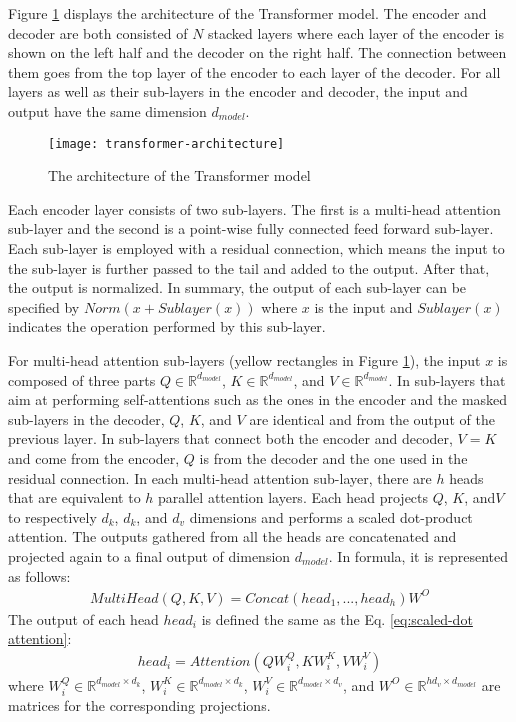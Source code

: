 Figure \ref{figure:transformer model} displays the architecture of the Transformer model. The encoder and decoder are both consisted of $ N $ stacked layers where each layer of the encoder is shown on the left half and the decoder on the right half. The connection between them goes from the top layer of the encoder to each layer of the decoder. For all layers as well as their sub-layers in the encoder and decoder, the input and output have the same dimension $ d_{model} $.

\begin{figure}[h]
\texttt{[image: transformer-architecture]}
\centering
\caption{The architecture of the Transformer model \cite{Vaswani2017}}
\label{figure:transformer model}
\end{figure}

Each encoder layer consists of two sub-layers. The first is a multi-head attention sub-layer and the second is a point-wise fully connected feed forward sub-layer. Each sub-layer is employed with a residual connection, which means the input to the sub-layer is further passed to the tail and added to the output. After that, the output is normalized. In summary, the output of each sub-layer can be specified by $ Norm(x+Sublayer(x)) $ where $ x $ is the input and $ Sublayer(x) $ indicates the operation performed by this sub-layer. 

For multi-head attention sub-layers (yellow rectangles in Figure \ref{figure:transformer model}), the input $ x $ is composed of three parts $ Q \in \mathbb{R}^{d_{model}} $, $ K \in \mathbb{R}^{d_{model}}$, and $ V \in \mathbb{R}^{d_{model}} $. In sub-layers that aim at performing self-attentions such as the ones in the encoder and the masked sub-layers in the decoder, $ Q $, $K$, and $V $ are identical and from the output of the previous layer. In sub-layers that connect both the encoder and decoder, $ V=K $ and come from the encoder, $ Q $ is from the decoder and the one used in the residual connection. In each multi-head attention sub-layer, there are $ h $ heads that are equivalent to $ h $ parallel attention layers. Each head projects $ Q $, $ K $, and$ V $ to respectively $ d_{k} $, $ d_{k} $, and $ d_{v} $ dimensions and performs a scaled dot-product attention. The outputs gathered from all the heads are concatenated and projected again to a final output of dimension $ d_{model} $. In formula, it is represented as follows:
\begin{align*}
MultiHead(Q,K,V) = Concat(head_{1},...,head_{h})W^{O}
\end{align*}
The output of each head $ head_{i} $ is defined the same as the Eq. \ref{eq:scaled-dot attention}:
\begin{align*}
head_{i} = Attention(QW_{i}^{Q},KW_{i}^{K},VW_{i}^{V})
\end{align*}
where $ W_{i}^{Q} \in \mathbb{R}^{d_{model} \times d_{k}} $, $ W_{i}^{K} \in \mathbb{R}^{d_{model} \times d_{k}} $, $ W_{i}^{V} \in \mathbb{R}^{d_{model} \times d_{v}} $, and $ W^{O} \in \mathbb{R}^{hd_{v} \times d_{model}} $ are matrices for the corresponding projections.

